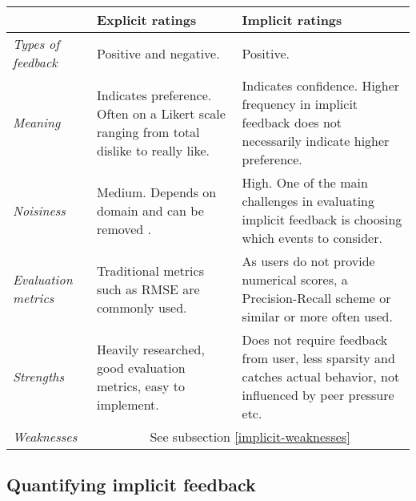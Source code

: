 \begin{table}[H]
    \begin{tabular}{|l|p{6cm}|p{6cm}|}
    \hline
    ~                  & \textbf{Explicit ratings}
                       & \textbf{Implicit ratings} \\ \hline

    \textit{Types of feedback}  
                       & Positive and negative.
                       & Positive. \\ \hline

    \textit{Meaning}
                       & Indicates preference. Often on a Likert scale ranging
                         from total dislike to really like.
                       & Indicates confidence. Higher frequency in implicit 
                         feedback does not necessarily indicate higher
                         preference. \\ \hline

    \textit{Noisiness}
                       & Medium. Depends on domain and can be removed 
                         \cite{amatriain2009like}.
                       & High. One of the main challenges in evaluating
                         implicit feedback is choosing which events to
                         consider. \\ \hline

    \textit{Evaluation metrics}
                       & Traditional metrics such as RMSE are commonly used.
                       & As users do not provide numerical scores, a
                         Precision-Recall scheme or similar or more often used.
                         \\ \hline

    \textit{Strengths}
                       & Heavily researched, good evaluation metrics, easy to
                         implement.
                       & Does not require feedback from user, less sparsity and
                         catches actual behavior, not influenced by peer
                         pressure etc. \\ \hline

    \textit{Weaknesses}
                       & \multicolumn{2}{c|}{See subsection \ref{implicit-weaknesses}} \\ \hline
    \end{tabular}
\end{table}

\clearpage

\subsection{Quantifying implicit feedback}

